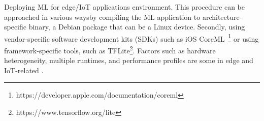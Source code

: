 Deploying ML \DIFdelbegin {}\DIFdelend for edge/IoT applications \DIFdelbegin {}\DIFdelend \DIFaddbegin {}\DIFaddend environment. This procedure can be approached in various ways\DIFdelbegin {}\DIFdelend \DIFaddbegin {}\DIFaddend by compiling the ML application to architecture-specific binary, \DIFdelbegin {}\DIFdelend \DIFaddbegin {}\DIFaddend a Debian package that can be \DIFdelbegin {}\DIFdelend \DIFaddbegin {}\DIFaddend a Linux device. Secondly, using vendor-specific software development kits (SDKs) such as iOS CoreML~\footnote{https://developer.apple.com/documentation/coreml} or using framework-specific tools, such as TFLite\footnote{https://www.tensorflow.org/lite}. Factors such as hardware heterogeneity, \DIFaddbegin {}\DIFaddend multiple runtimes, and \DIFaddbegin {}\DIFaddend performance profiles are some \DIFdelbegin {}\DIFdelend \DIFaddbegin {}\DIFaddend in edge and IoT-related \DIFdelbegin {}\DIFdelend \DIFaddbegin {}\DIFaddend .


